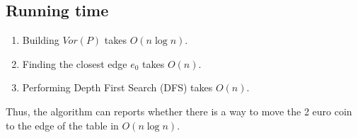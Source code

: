 \documentclass[12pt]{article}
\begin{document}
\subsection*{Running time}
\begin{enumerate}
    \item Building $Vor(P)$ takes $O(n\log{n})$.
    \item Finding the closest edge $e_0$ takes $O(n)$.
    \item Performing Depth First Search (DFS) takes $O(n)$.
\end{enumerate}

Thus, the algorithm can reports whether there is a way to move the 2 euro coin to the edge
of the table in $O(n\log{n})$.
\end{document}
